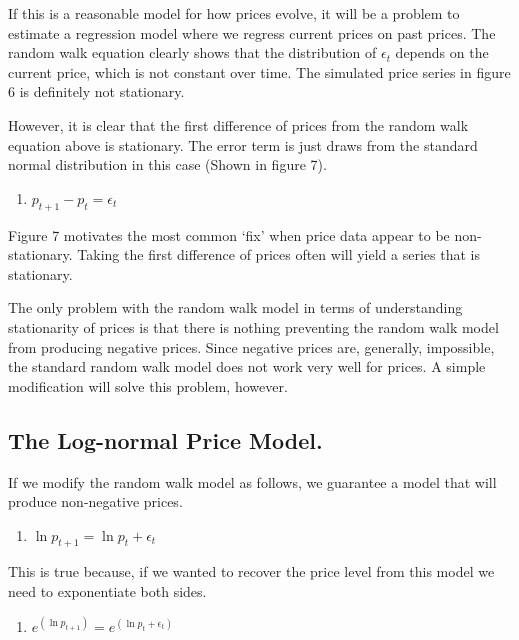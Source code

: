 \documentclass[
  letterpaper,
  DIV=11,
  numbers=noendperiod]{scrreprt}
\providecommand{\tightlist}{%
  \setlength{\itemsep}{0pt}\setlength{\parskip}{0pt}}\usepackage{longtable,booktabs,array}
\begin{document}
If this is a reasonable model for how prices evolve, it will be a
problem to estimate a regression model where we regress current prices
on past prices. The random walk equation clearly shows that the
distribution of \(\epsilon_t\) depends on the current price, which is
not constant over time. The simulated price series in figure 6 is
definitely not stationary.

However, it is clear that the first difference of prices from the random
walk equation above is stationary. The error term is just draws from the
standard normal distribution in this case (Shown in figure 7).

\begin{enumerate}
\def\labelenumi{(\arabic{enumi})}
\setcounter{enumi}{3}
\tightlist
\item
  \(p_{t+1} - p_{t} = \epsilon_t\)
\end{enumerate}

Figure 7 motivates the most common `fix' when price data appear to be
non-stationary. Taking the first difference of prices often will yield a
series that is stationary.

The only problem with the random walk model in terms of understanding
stationarity of prices is that there is nothing preventing the random
walk model from producing negative prices. Since negative prices are,
generally, impossible, the standard random walk model does not work very
well for prices. A simple modification will solve this problem, however.

\hypertarget{the-log-normal-price-model.}{%
\subsection{The Log-normal Price
Model.}\label{the-log-normal-price-model.}}

If we modify the random walk model as follows, we guarantee a model that
will produce non-negative prices.

\begin{enumerate}
\def\labelenumi{(\arabic{enumi})}
\setcounter{enumi}{4}
\tightlist
\item
  \(\ln{p_{t+1}} = \ln{p_{t}} + \epsilon_t\)
\end{enumerate}

This is true because, if we wanted to recover the price level from this
model we need to exponentiate both sides.

\begin{enumerate}
\def\labelenumi{(\arabic{enumi})}
\setcounter{enumi}{5}
\tightlist
\item
  \(e^{(\ln{p_{t+1}})} = e^{(\ln{p_{t}} + \epsilon_t)}\)
\end{enumerate}
\end{document}
